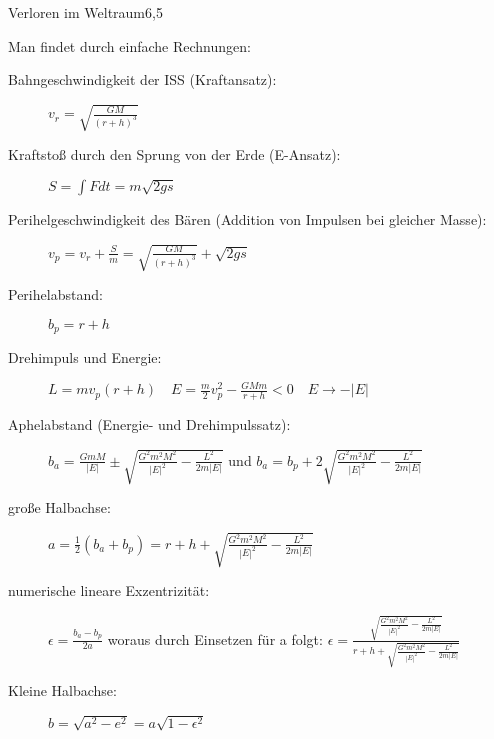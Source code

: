 \begin{problem}{Verloren im Weltraum}{6,5}
\begin{solution}
Man findet durch einfache Rechnungen:
\begin{description}
\item [Bahngeschwindigkeit der ISS (Kraftansatz):] $v_r=\sqrt{\frac{GM}{(r+h)^3}}$
\item [Kraftstoß durch den Sprung von der Erde (E-Ansatz):] $S=\int Fdt=m\sqrt{2gs}$
\item [Perihelgeschwindigkeit des Bären (Addition von Impulsen bei gleicher Masse):] $v_p=v_r+\frac Sm=\sqrt{\frac{GM}{(r+h)^3}}+\sqrt{2gs}$
\item [Perihelabstand:] $b_p=r+h$
\item [Drehimpuls und Energie:] $L=mv_p(r+h)\quad E=\frac m2 v_p^2-\frac{GMm}{r+h}<0 \quad E\rightarrow -|E|$
\item [Aphelabstand (Energie- und Drehimpulssatz):] $b_a=\frac{GmM}{|E|}\pm\sqrt{\frac{G^2m^2M^2}{|E|^2}-\frac{L^2}{2m|E|}}$ und $b_a=b_p+2\sqrt{\frac{G^2m^2M^2}{|E|^2}-\frac{L^2}{2m|E|}}$
\item [große Halbachse:] $a=\frac 12 (b_a+b_p)=r+h+\sqrt{\frac{G^2m^2M^2}{|E|^2}-\frac{L^2}{2m|E|}}$
\item [numerische lineare Exzentrizität:] $\epsilon = \frac{b_a-b_p}{2a}$ woraus durch Einsetzen für a folgt: $\epsilon=\frac{\sqrt{\frac{G^2m^2M^2}{|E|^2}-\frac{L^2}{2m|E|}}}{r+h+\sqrt{\frac{G^2m^2M^2}{|E|^2}-\frac{L^2}{2m|E|}}}$
\item [Kleine Halbachse:] $b=\sqrt{a^2-e^2}=a\sqrt{1-\epsilon^2}$
\end{description}


\end{solution}
\end{problem}
